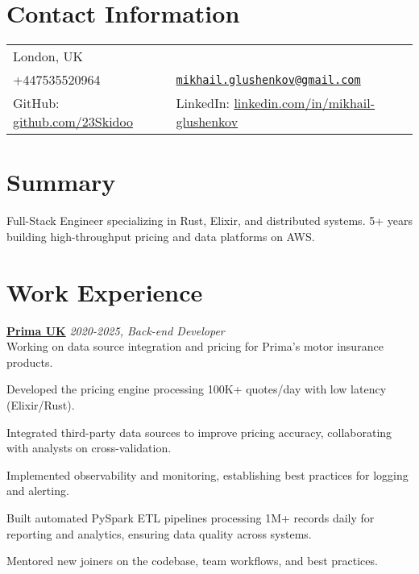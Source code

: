 \documentclass[margin,line]{res}
\begin{document}

\begin{resume}
      \section{\sc Contact Information}
      \vspace{.05in}
      \begin{tabular}{@{}p{3in}p{4in}}
            London, UK                                                                                          \\
            +447535520964                                                   &
            \href{mailto:mikhail.glushenkov@gmail.com}{\texttt{mikhail.glushenkov@gmail.com}}                   \\
            GitHub: \href{https://github.com/23Skidoo}{github.com/23Skidoo} &
            LinkedIn: \href{https://www.linkedin.com/in/mikhail-glushenkov}{linkedin.com/in/mikhail-glushenkov} \\
      \end{tabular}

      \section{\sc Summary} Full-Stack Engineer specializing in Rust, Elixir, and
      distributed systems. 5+ years building high-throughput pricing and data
      platforms on AWS.

      \section{\sc Work Experience}

       {\bf \href{https://helloprima.co.uk}{Prima UK}} \hfill {\it 2020-2025, Back-end Developer}\\
      Working on data source integration and pricing for Prima's motor insurance
      products.\\
      \begin{list}{}{\leftmargin=1.5em}
            \item Developed the pricing engine processing 100K+ quotes/day with low latency (Elixir/Rust).
            \item Integrated third-party data sources to improve pricing accuracy, collaborating with analysts on cross-validation.
            \item Implemented observability and monitoring, establishing best practices for logging and alerting.
            \item Built automated PySpark ETL pipelines processing 1M+ records daily for
                  reporting and analytics, ensuring data quality across systems.
            \item Mentored new joiners on the codebase, team workflows, and best practices.
      \end{list}


\end{resume}
\end{document}
